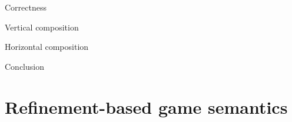 \documentclass[aspectratio=141]{beamer}
\newcommand{\htr}[3]{{ {#1} \mathbbm{\{} {#2} \mathbbm{\}} {#3} }}
\begin{document}
\begin{frame}{Correctness}

\end{frame}

\begin{frame}{Vertical composition}

\end{frame}

\begin{frame}{Horizontal composition}

\end{frame}

\begin{frame}{Conclusion}

\end{frame}


\section{Refinement-based game semantics} %

%
%
%
\end{document}
